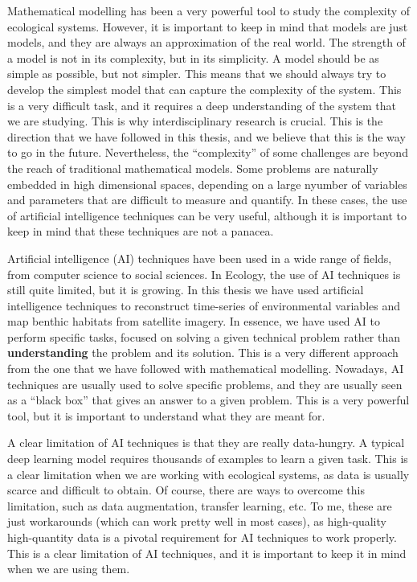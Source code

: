 Mathematical modelling has been a very powerful tool to study the complexity of
ecological systems. However, it is important to keep in mind that models are
just models, and they are always an approximation of the real world. The
strength of a model is not in its complexity, but in its simplicity. A model
should be as simple as possible, but not simpler. This means that we should
always try to develop the simplest model that can capture the complexity of the
system. This is a very difficult task, and it requires a deep understanding of
the system that we are studying. This is why interdisciplinary research is
crucial. This is the direction that we have followed in this thesis, and we
believe that this is the way to go in the future. Nevertheless, the
``complexity'' of some challenges are beyond the reach of traditional
mathematical models. Some problems are naturally embedded in high dimensional
spaces, depending on a large nyumber of variables and parameters that are
difficult to measure and quantify. In these cases, the use of artificial
intelligence techniques can be very useful, although it is important to keep in
mind that these techniques are not a panacea.


Artificial intelligence (AI) techniques have been used in a wide range of
fields, from computer science to social sciences. In Ecology, the use of
AI techniques is still quite limited, but it is growing. In this thesis we have
used artificial intelligence techniques to reconstruct time-series of
environmental variables and map benthic habitats from satellite imagery. In
essence, we have used AI to perform specific tasks, focused on solving a given
technical problem rather than \textbf{understanding} the problem and its
solution. This is a very different approach from the one that we have followed
with mathematical modelling. Nowadays, AI techniques are usually used to solve
specific problems, and they are usually seen as a ``black box'' that gives an
answer to a given problem. This is a very powerful tool, but it is important to
understand what they are meant for.

A clear limitation of AI techniques is that they are really data-hungry. A
typical deep learning model requires thousands of examples to learn a given
task. This is a clear limitation when we are working with ecological systems,
as data is usually scarce and difficult to obtain. Of course, there are ways
to overcome this limitation, such as data augmentation, transfer learning, etc.
To me, these are just workarounds (which can work pretty well in most cases),
as high-quality high-quantity data is a pivotal requirement for AI techniques
to work properly. This is a clear limitation of AI techniques, and it is
important to keep it in mind when we are using them.

